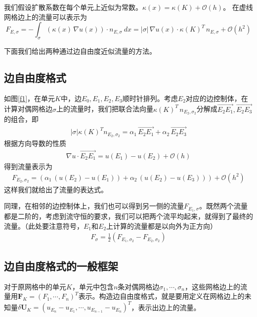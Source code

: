 \documentclass[12pt,a4paper]{article}
\theoremstyle{plain}
\begin{document}
我们假设扩散系数在每个单元上近似为常数。$\kappa(x) = \kappa(K) + \mathcal{O}(h)$。
在虚线网格边上的流量可以表示为
\begin{equation*}
F_{E, \sigma} = - \int_{\sigma} (\kappa(x) \, \nabla u(x)) \cdot n_{E, \sigma} \ dx = |\sigma| \,  \nabla u(x) \cdot \kappa(K)^T \, n_{E, \sigma} + \mathcal{O}(h^2)
\end{equation*}

下面我们给出两种通过边自由度近似流量的方法。 

\subsection*{边自由度格式}

如图\ref{f1}，在单元$K$中，边$E_0,E_1,E_2,E_3$顺时针排列。考虑$E_2$对应的边控制体，在计算对偶网格边$\sigma$上的流量时，我们把联合法向量$\kappa(K)^T \, n_{E_2, \sigma_2}$分解成$\overrightarrow{E_2 E_1}, \overrightarrow{E_2 E_3}$的组合，即
\begin{align*}
|\sigma| \kappa(K)^T n_{E_2, \sigma_2} = \alpha_1 \, \overrightarrow{E_2 E_1} + \alpha_2 \, \overrightarrow{E_2 E_3}
\end{align*}
根据方向导数的性质
\begin{align*}
\nabla u \cdot \overrightarrow{E_2 E_1} = u(E_1) - u(E_2) + \mathcal{O}(h)
\end{align*}
得到流量表示为
\begin{align*}
F_{E_2, \sigma_2} = (\alpha_{1} \, (u(E_2) - u(E_1)) + \alpha_{2} \, (u(E_2) - u(E_3))) + \mathcal{O}(h^2)
\end{align*}
这样我们就给出了流量的表达式。

同理，在相邻的边控制体上，我们也可以得到另一侧的流量$F_{E_1, \sigma}$。既然两个流量都是二阶的，考虑到流守恒的要求，我们可以把两个流平均起来，就得到了最终的流量。（此处要注意符号，$E_1$和$E_2$上计算的流量都是以向外为正方向）
\begin{align*}
F_{\sigma} = \frac12 (F_{E_1, \sigma_2} - F_{E_2, \sigma_2})
\end{align*}

\subsection*{边自由度格式的一般框架}

对于原网格中的单元$K$，单元中包含$n$条对偶网格边$\sigma_1,\cdots,\sigma_n$，这些网格边上的流量用$\mathbf{F}_K = (F_1,\cdots,F_n)^T$表示。构造边自由度格式，就是要用定义在网格边上的未知量$\delta \mathbf{U}_K = (u_{E_n}-u_{E_1},\cdots,u_{E_{n-1}}-u_{E_{n}})^T$，表示出边上的流量。
\end{document}
